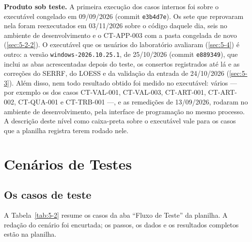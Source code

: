 \textbf{Produto sob teste.} A primeira execução dos casos internos foi sobre o executável congelado em 09/09/2026 (commit \texttt{e3b4d7e}). Os sete que reprovaram nela foram reexecutados em 03/11/2026 sobre o código daquele dia, seis no ambiente de desenvolvimento e o CT-APP-003 com a pasta congelada de novo (\ref{sec:5-2-2}). O executável que os usuários do laboratório avaliaram (\ref{sec:5-4}) é outro: a versão \texttt{windows-\allowbreak{}2026.\allowbreak{}10.\allowbreak{}25.\allowbreak{}1}, de 25/10/2026 (commit \texttt{e889349}), que inclui as abas acrescentadas depois do teste, os consertos registrados até lá e as correções do SERRF, do LOESS e da validação da entrada de 24/10/2026 (\ref{sec:5-3}). Além disso, nem todo resultado obtido foi medido no executável: vários --- por exemplo os dos casos CT-VAL-001, CT-VAL-003, CT-ART-001, CT-ART-002, CT-QUA-001 e CT-TRB-001 ---, e as remedições de 13/09/2026, rodaram no ambiente de desenvolvimento, pela interface de programação no mesmo processo. A descrição deste nível como caixa-preta sobre o executável vale para os casos que a planilha registra terem rodado nele.


\section{Cenários de Testes}\label{sec:5-2}

\subsection{Os casos de teste}\label{sec:5-2-1}

A Tabela~\ref{tab:5-2} resume os casos da aba ``Fluxo de Teste'' da planilha. A redação do cenário foi encurtada; os passos, os dados e os resultados completos estão na planilha.

